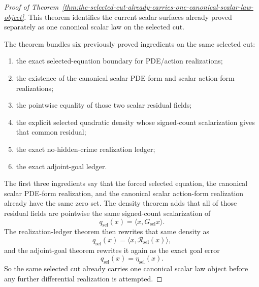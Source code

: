 \begin{proof}[Proof of Theorem~\ref{thm:the-selected-cut-already-carries-one-canonical-scalar-law-object}]
\label{proof:thm:the-selected-cut-already-carries-one-canonical-scalar-law-object}
This theorem identifies the current scalar surfaces already proved separately
as one canonical scalar law on the selected cut.

The theorem bundles six previously proved ingredients on the same selected
cut:
\begin{enumerate}
\item the exact selected-equation boundary for PDE/action realizations;
\item the existence of the canonical scalar PDE-form and scalar action-form
      realizations;
\item the pointwise equality of those two scalar residual fields;
\item the explicit selected quadratic density whose signed-count scalarization
      gives that common residual;
\item the exact no-hidden-crime realization ledger;
\item the exact adjoint-goal ledger.
\end{enumerate}

The first three ingredients say that the forced selected equation,
the canonical scalar PDE-form realization, and the canonical scalar
action-form realization already have the same zero set. The density theorem
adds that all of those residual fields are pointwise the same
signed-count scalarization of
\[
q_{\mathrm{sel}}(x)=\langle x,G_{\mathrm{sel}}x\rangle.
\]
The realization-ledger theorem then rewrites that same density as
\[
q_{\mathrm{sel}}(x)=\langle x,\mathcal R_{\mathrm{sel}}(x)\rangle,
\]
and the adjoint-goal theorem rewrites it again as the exact goal error
\[
q_{\mathrm{sel}}(x)=\eta_{\mathrm{sel}}(x).
\]
So the same selected cut already carries one canonical scalar law object
before any further differential realization is attempted.
\end{proof}

